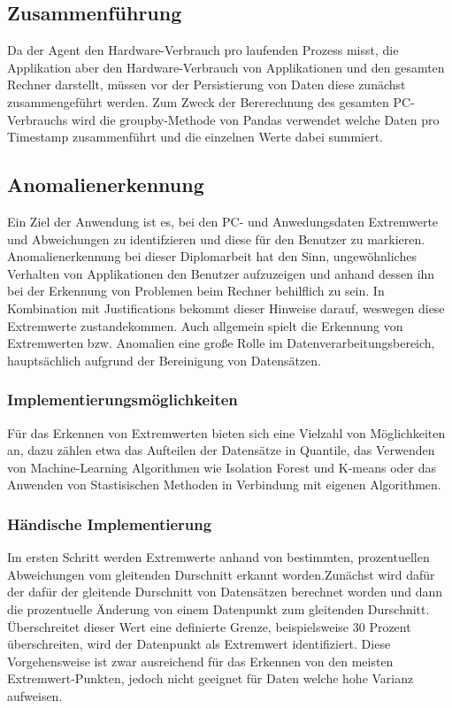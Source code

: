 \documentclass{report}
\begin{document}
\subsection{Zusammenführung}
Da der Agent den Hardware-Verbrauch pro laufenden Prozess misst, die Applikation aber den Hardware-Verbrauch von Applikationen und den gesamten Rechner darstellt, müssen vor der Persistierung von Daten diese zunächst zusammengeführt werden. Zum Zweck der Bererechnung des gesamten PC-Verbrauchs wird die groupby-Methode von Pandas verwendet welche Daten pro Timestamp zusammenführt und die einzelnen Werte dabei summiert.
\subsection{Anomalienerkennung}
Ein Ziel der Anwendung ist es, bei den PC- und Anwedungsdaten Extremwerte und Abweichungen zu identifzieren und diese für den Benutzer zu markieren. Anomalienerkennung bei dieser Diplomarbeit hat den Sinn, ungewöhnliches Verhalten von Applikationen den Benutzer aufzuzeigen und anhand dessen ihn bei der Erkennung von Problemen beim Rechner behilflich zu sein. In Kombination mit Justifications bekommt dieser Hinweise darauf, weswegen diese Extremwerte zustandekommen. Auch allgemein spielt die Erkennung von Extremwerten bzw. Anomalien eine große Rolle im Datenverarbeitungsbereich, hauptsächlich aufgrund der Bereinigung von Datensätzen.
\subsubsection{Implementierungsmöglichkeiten}
Für das Erkennen von Extremwerten bieten sich eine Vielzahl von Möglichkeiten an, dazu zählen etwa das Aufteilen der Datensätze in Quantile, das Verwenden von Machine-Learning Algorithmen wie Isolation Forest und K-means oder das Anwenden von Stastisischen Methoden in Verbindung mit eigenen Algorithmen. 
\subsubsection{Händische Implementierung}
Im ersten Schritt werden Extremwerte anhand von bestimmten, prozentuellen Abweichungen vom gleitenden Durschnitt erkannt worden.Zunächst wird dafür der dafür der gleitende Durschnitt von Datensätzen berechnet worden und dann die prozentuelle Änderung von einem Datenpunkt zum gleitenden Durschnitt. Überschreitet dieser Wert eine definierte Grenze, beispielsweise 30 Prozent überschreiten, wird der Datenpunkt als Extremwert identifiziert.
Diese Vorgehensweise ist zwar ausreichend für das Erkennen von den meisten Extremwert-Punkten, jedoch nicht geeignet für Daten welche hohe Varianz aufweisen. 
\end{document}
